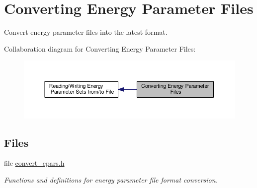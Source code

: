 \hypertarget{group__energy__parameters__convert}{\section{Converting Energy Parameter Files}
\label{group__energy__parameters__convert}
}


Convert energy parameter files into the latest format.  


Collaboration diagram for Converting Energy Parameter Files\-:
\nopagebreak
\begin{figure}[H]
\begin{center}
\leavevmode
\includegraphics[width=350pt]{group__energy__parameters__convert}
\end{center}
\end{figure}
\subsection*{Files}
\begin{DoxyCompactItemize}
\item 
file \hyperlink{convert__epars_8h}{convert\-\_\-epars.\-h}
\begin{DoxyCompactList}\small\item\em Functions and definitions for energy parameter file format conversion. \end{DoxyCompactList}\end{DoxyCompactItemize}
